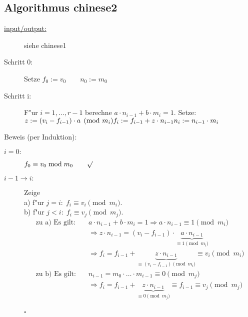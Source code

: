 \documentclass{article}
\begin{document}
\subsection*{Algorithmus chinese2}
\begin{description}
	\item[\underline{input/output:}] siehe chinese1
	\item[Schritt 0:] Setze $f_0 := v_0 \qquad n_0 := m_0$
	\item[Schritt i:] F"ur $i=1, \dots, r-1$ berechne $a \cdot n_{i-1} + b \cdot m_i = 1.$ Setze: \\
		$z := (v_i - f_{i-1}) \cdot a \pmod {m_i} \\
		f_i := f_{i-1} + z \cdot n_{i-1} \\
		n_i := n_{i-1} \cdot m_i$
\end{description}
Beweis (per Induktion):
\begin{description}
	\item[\underline{$i=0:$}] $f_0 \equiv v_0 \bmod m_0 \qquad \surd$
	\item[\underline{$i\!-\!1 \rightarrow i:$}] Zeige \\
		a) f"ur $j=i: \; f_i \equiv v_i \pmod {m_i}.$ \\
		b) f"ur $j<i: \; f_i \equiv v_j \pmod {m_j}.$
	\begin{equation*}
		\begin{split}
			\text{zu a) Es gilt:} \quad & a \cdot n_{i-1} + b \cdot m_i = 1 \Rightarrow a \cdot n_{i-1} \equiv 1 \pmod {m_i} \\
						& \Longrightarrow z \cdot n_{i-1} = (v_i - f_{i-1}) \cdot \underbrace{a \cdot n_{i-1}}_{\equiv 1 \pmod {m_i}} \\
						& \Longrightarrow f_i = f_{i-1} + \underbrace{z \cdot n_{i-1}}_{\equiv (v_i - f_{i-1}) \pmod {m_i}} \equiv v_i \pmod {m_i} \\
			\text{zu b) Es gilt:} \quad & n_{i-1} = m_0 \cdot \dotso \cdot m_{i-1} \equiv 0 \pmod {m_j} \\
						& \Longrightarrow f_i = f_{i-1} + \underbrace{z \cdot n_{i-1}}_{\equiv 0 \pmod {m_j}} \equiv f_{i-1} \equiv v_j \pmod {m_j} \\
		\end{split}
	\end{equation*}
	\begin{flushright}
		$\square$
	\end{flushright}
\end{description}
\end{document}
